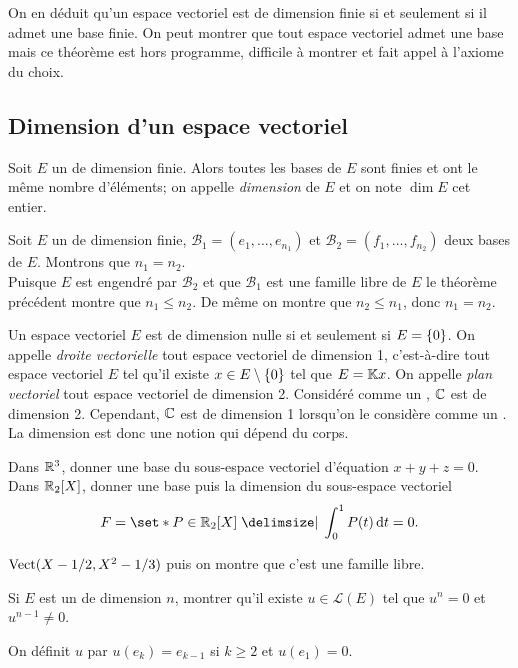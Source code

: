 \documentclass{magnolia}
\begin{document}
\begin{remarques}
\remarque[utile=-3] On en déduit qu'un espace vectoriel est de dimension finie si et seulement si il
  admet une base finie.
\remarque On peut montrer que tout espace vectoriel admet une base mais ce théorème est hors programme,
  difficile à montrer et fait appel à l'axiome du choix.
\end{remarques}

\subsection{Dimension d'un espace vectoriel}


\begin{definition}[utile=-3]
Soit $E$ un \Kev de dimension finie. Alors toutes les bases de $E$ sont finies et ont le
même nombre d'éléments; on appelle \emph{dimension} de $E$ et on note $\dim E$ cet
entier.
\end{definition}
\begin{preuve}
Soit $E$ un \Kev de dimension finie, $\mathcal{B}_1=(e_1,\ldots,e_{n_1})$ et
$\mathcal{B}_2=(f_1,\ldots,f_{n_2})$ deux bases de $E$. Montrons que
$n_1=n_2$.\\
Puisque $E$ est engendré par $\mathcal{B}_2$ et que $\mathcal{B}_1$ est une
famille libre de $E$ le théorème précédent montre que $n_1\leq n_2$. De même on
montre que $n_2\leq n_1$, donc $n_1=n_2$.
\end{preuve}

\begin{remarques}
\remarque[utile=-2] Un espace vectoriel $E$ est de dimension nulle si et seulement
  si $E=\left\{0\right\}$. On appelle \emph{droite vectorielle} tout espace vectoriel de dimension 1,
  c'est-à-dire tout espace vectoriel $E$ tel qu'il existe $x\in E\setminus\left\{0\right\}$ tel
  que $E=\mathbb{K} x$. On appelle \emph{plan vectoriel} tout espace vectoriel de dimension 2.
\remarque[utile=-1] Considéré comme un \Rev, $\mathbb{C}$ est de dimension 2. Cependant, $\mathbb{C}$
  est de dimension 1 lorsqu'on le considère comme un \Cev. La dimension
  est donc une notion qui dépend du corps.
\end{remarques}

\begin{exos}
\exo Dans $\mathbb{R}^3$, donner une base du sous-espace vectoriel d'équation $x+y+z=0$.
\exo Dans $\polyR[2]$, donner une base puis la dimension du sous-espace vectoriel
  \[F=\enstq{P\in\polyR[2]}{\integ{0}{1}{P(t)}{t}=0}.\]
  
  \begin{sol}
  $\operatorname{Vect}(X-1/2,X^2-1/3)$ puis on montre que c'est une famille libre.
  \end{sol}
\exo Si $E$ est un \Kev de dimension $n$, montrer qu'il existe $u\in\mathcal{L}(E)$
  tel que $u^n=0$ et $u^{n-1}\neq 0$.
  \begin{sol}
  On définit $u$ par $u(e_k)=e_{k-1}$ si $k\geq 2$ et $u(e_1)=0$.
  \end{sol}
\end{exos}
\end{document}
